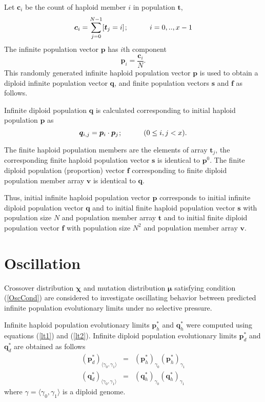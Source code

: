 Let $\bm{c}_i$ be the count of haploid member $i$ in population $\bm{t}$,
\[
\bm{c}_i = \sum \limits_{j=0}^{N-1} [\bm{t}_j = i]  \hspace{0.01in}; \hspace{30pt}  {i = 0,.., x-1}
\]
The infinite population vector $\bm{p}$ has $i$th component
\[
\bm{p}_i = \frac{\bm{c}_i}{ N }.
\]
This randomly generated infinite haploid population vector $\bm{p}$ is used to obtain a diploid infinite population vector $\bm{q}$,  
and finite population vectors $\bm{s}$ and $\bm{f}$ as follows.

Infinite diploid population $\bm{q}$ is calculated corresponding to initial haploid population $\bm{p}$ as
\[
\bm{q}_{i,j} = \bm{p}_i \cdot \bm{p}_j  \hspace{0.01in}; \hspace{30pt}  (0 \leq i,j < x).
\]

The finite haploid population members are the elements of array $\bm{t}_j$, 
the corresponding finite haploid population vector $\bm{s}$ is identical to $\bm{p}^0$. 
The finite diploid population (proportion) vector $\bm{f}$ corresponding to 
finite diploid population member array $\bm{v}$ is identical to $\bm{q}$.

Thus, initial infinite haploid population vector $\bm{p}$ corresponds to initial infinite diploid 
population vector $\bm{q}$ and to initial finite 
haploid population vector $\bm{s}$ with population size $N$ and population member array $\bm{t}$ 
and to initial finite diploid population vector $\bm{f}$ with population size $N^2$ and population member array $\bm{v}$.

\section{Oscillation}
\label{Oscillation}

Crossover distribution $\bm{\chi}$ and mutation distribution $\bm{\mu}$ satisfying 
condition (\ref{OscCond}) are considered to investigate oscillating behavior between 
predicted infinite population evolutionary limits under no selective pressure.

Infinite haploid population evolutionary limits $\bm{p}_h^{\ast}$ and $\bm{q}_h^{\ast}$ 
were computed using equations (\ref{lt1}) and (\ref{lt2}). 
Infinite diploid population evolutionary limits $\bm{p}_d^{\ast}$ and $\bm{q}_d^{\ast}$ are obtained as follows
\begin{eqnarray*}
({\bm{p}_d^{\ast}})_{\langle \gamma_0, \gamma_1 \rangle} & = & ({\bm{p}_h^{\ast}})_{\gamma_0} ({\bm{p}_h^{\ast}})_{\gamma_1} \\
({\bm{q}_d^{\ast}})_{\langle \gamma_0, \gamma_1 \rangle} & = & ({\bm{q}_h^{\ast}})_{\gamma_0} ({\bm{q}_h^{\ast}})_{\gamma_1}
\end{eqnarray*}
where $\gamma = \langle \gamma_0, \gamma_1 \rangle$ is a diploid genome.

